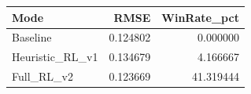 \begin{tabular}{lrr}
\toprule
Mode & RMSE & WinRate_pct \\
\midrule
Baseline & 0.124802 & 0.000000 \\
Heuristic_RL_v1 & 0.134679 & 4.166667 \\
Full_RL_v2 & 0.123669 & 41.319444 \\
\bottomrule
\end{tabular}
